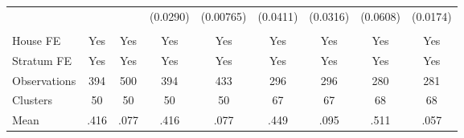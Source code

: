 {\begin{tabular}{l*{8}{c}}
                &         &         & (0.0290)&(0.00765)& (0.0411)& (0.0316)& (0.0608)& (0.0174)\\
                &         &         &         &         &         &         &         &         \\
House FE        &      Yes&      Yes&      Yes&      Yes&      Yes&      Yes&      Yes&      Yes\\
Stratum FE      &      Yes&      Yes&      Yes&      Yes&      Yes&      Yes&      Yes&      Yes\\
\midrule
Observations    &      394&      500&      394&      433&      296&      296&      280&      281\\
Clusters        &       50&       50&       50&       50&       67&       67&       68&       68\\
Mean            &     .416&     .077&     .416&     .077&     .449&     .095&     .511&     .057\\
\bottomrule
\end{tabular}
}
